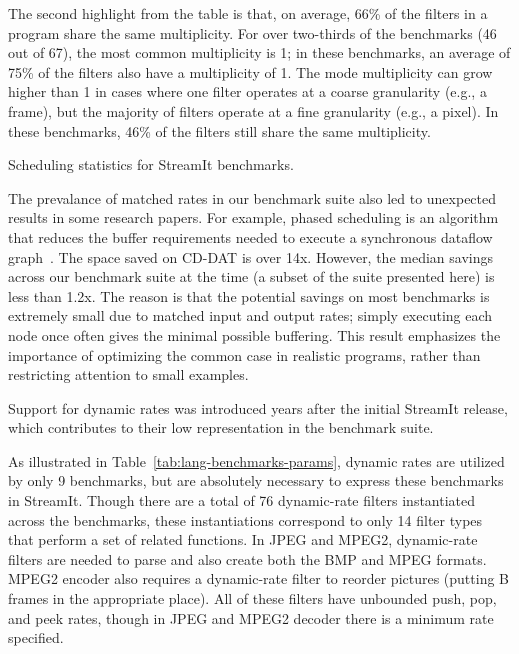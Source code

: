 The second highlight from the table is that, on average, 66\% of the
filters in a program share the same multiplicity.  For over two-thirds
of the benchmarks (46 out of 67), the most common multiplicity is 1;
in these benchmarks, an average of 75\% of the filters also have a
multiplicity of 1.  The mode multiplicity can grow higher than 1 in
cases where one filter operates at a coarse granularity (e.g., a
frame), but the majority of filters operate at a fine granularity
(e.g., a pixel).  In these benchmarks, 46\% of the filters still share
the same multiplicity.

\begin{table}[t!]
\vspace{-0.75\baselineskip}
\caption{Scheduling statistics for StreamIt 
benchmarks.\protect\label{tab:lang-benchmarks-params}}
\vspace{-0.5in}
\end{table}

The prevalance of matched rates in our benchmark suite also led to
unexpected results in some research papers.  For example, phased
scheduling is an algorithm that reduces the buffer requirements needed
to execute a synchronous dataflow graph~\cite{karczmarek-lctes03}.
The space saved on CD-DAT is over 14x.  However, the median savings
across our benchmark suite at the time (a subset of the suite
presented here) is less than 1.2x.  The reason is that the potential
savings on most benchmarks is extremely small due to matched input and
output rates; simply executing each node once often gives the minimal
possible buffering.  This result emphasizes the importance of
optimizing the common case in realistic programs, rather than
restricting attention to small examples.

\myitem {\dynamicrates} Support for dynamic rates was introduced years
after the initial StreamIt release, which contributes to their low
representation in the benchmark suite.
\label{sec:dynamic}

As illustrated in Table~\ref{tab:lang-benchmarks-params}, dynamic
rates are utilized by only 9 benchmarks, but are absolutely necessary
to express these benchmarks in StreamIt.  Though there are a total of
76 dynamic-rate filters instantiated across the benchmarks, these
instantiations correspond to only 14 filter types that perform a set
of related functions.  In JPEG and MPEG2, dynamic-rate filters are
needed to parse and also create both the BMP and MPEG formats.  MPEG2
encoder also requires a dynamic-rate filter to reorder pictures
(putting B frames in the appropriate place).  All of these filters
have unbounded push, pop, and peek rates, though in JPEG and MPEG2
decoder there is a minimum rate specified.

